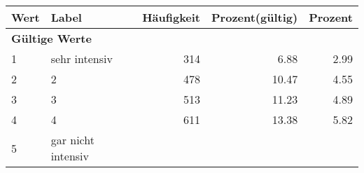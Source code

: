      \begin{longtable}{lXrrr}
     \toprule
     \textbf{Wert} & \textbf{Label} & \textbf{Häufigkeit} & \textbf{Prozent(gültig)} & \textbf{Prozent} \\
     \endhead
     \midrule
     \multicolumn{5}{l}{\textbf{Gültige Werte}}\\

     1 &
     \multicolumn{1}{X}{ sehr intensiv   } &


       \num{314} &
       \num[round-mode=places,round-precision=2]{6.88} &
         \num[round-mode=places,round-precision=2]{2.99} \\

     2 &
     \multicolumn{1}{X}{ 2   } &


       \num{478} &
       \num[round-mode=places,round-precision=2]{10.47} &
         \num[round-mode=places,round-precision=2]{4.55} \\

     3 &
     \multicolumn{1}{X}{ 3   } &


       \num{513} &
       \num[round-mode=places,round-precision=2]{11.23} &
         \num[round-mode=places,round-precision=2]{4.89} \\

     4 &
     \multicolumn{1}{X}{ 4   } &


       \num{611} &
       \num[round-mode=places,round-precision=2]{13.38} &
         \num[round-mode=places,round-precision=2]{5.82} \\

     5 &
     \multicolumn{1}{X}{ gar nicht intensiv   } &



\end{longtable}
